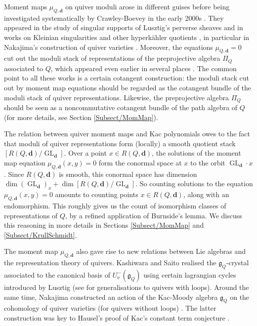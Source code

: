 \documentclass[11pt,english]{article}
\numberwithin{equation}{section}
\numberwithin{figure}{section}
\theoremstyle{definition}
\theoremstyle{plain}
\theoremstyle{remark}
\DeclareMathOperator{\GL}{GL}
\newcommand\dd{\mathbf{d}}
\begin{document}
Moment maps $\mu_{Q,\dd}$ on quiver moduli arose in different guises
before being investigated systematically by Crawley-Boevey in the
early 2000s \cite{CB01,CB02,CB03a}. They appeared in the study of
singular supports of Lusztig's perverse sheaves \cite{Lus91,KS97}
and in works on Kleinian singularities and other hyperkähler quotients
\cite{Kro89,KN90,CBH98}, in particular in Nakajima's construction
of quiver varieties \cite{Nak94,Nak98}. Moreover, the equations $\mu_{Q,\dd}=0$
cut out the moduli stack of representations of the preprojective algebra
$\Pi_{Q}$ associated to $Q$, which appeared even earlier in several
places \cite{GP79,DR79,BGL87,CB99b}. The common point to all these
works is a certain cotangent construction: the moduli stack cut out
by moment map equations should be regarded as the cotangent bundle
of the moduli stack of quiver representations. Likewise, the preprojective
algebra $\Pi_{Q}$ should be seen as a noncommutative cotangent bundle
of the path algebra of $Q$ (for more details, see Section \ref{Subsect/MomMap}).

The relation between quiver moment maps and Kac polynomials owes to
the fact that moduli of quiver representations form (locally) a smooth
quotient stack $\left[R(Q,\dd)/\GL_{\dd}\right]$. Over a point $x\in R(Q,\dd)$,
the solutions of the moment map equation $\mu_{Q,\dd}(x,y)=0$ form
the conormal space at $x$ to the orbit $\GL_{\dd}\cdot x$. Since
$R(Q,\dd)$ is smooth, this conormal space has dimension $\dim(\GL_{\dd})_{x}+\dim\left[R(Q,\dd)/\GL_{\dd}\right]$.
So counting solutions to the equation $\mu_{Q,\dd}(x,y)=0$ amounts
to counting points $x\in R(Q,\dd)$, along with an endomorphism. This
roughly gives us the count of isomorphism classes of representations
of $Q$, by a refined application of Burnside's lemma. We discuss
this reasoning in more details in Sections \ref{Subsect/MomMap} and
\ref{Subsect/KrullSchmidt}.

The moment map $\mu_{Q,\dd}$ also gave rise to new relations between
Lie algebras and the representation theory of quivers. Kashiwara and
Saito realised the $\mathfrak{g}_{Q}$-crystal associated to the canonical
basis of $U_{\nu}^{-}(\mathfrak{g}_{Q})$ using certain lagrangian
cycles introduced by Lusztig \cite{Lus91,KS97} (see \cite{KKS09,Boz16}
for generalisations to quivers with loops). Around the same time,
Nakajima constructed an action of the Kac-Moody algebra $\mathfrak{g}_{Q}$
on the cohomology of quiver varieties (for quivers without loops)
\cite{Nak98}. The latter construction was key to Hausel's proof of
Kac's constant term conjecture \cite{Hau10}.
\end{document}
